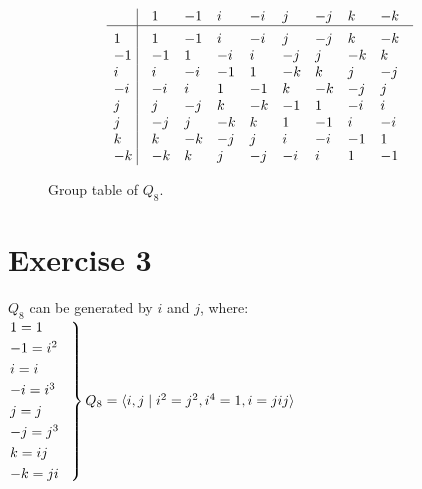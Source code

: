 \documentclass{article}
\begin{document}
    \begin{figure}[H]
        \centering

        \[\vbox{\tabskip0.5em\offinterlineskip
        \halign{\strut$#$\hfil\ \tabskip1em\vrule&&$#$\hfil\cr
        ~   & 1 & -1 & i & -i & j & -j & k & -k \cr
        \noalign{\hrule}\vrule height 12pt width 0pt
        1 & 1 & -1 & i & -i & j & -j & k & -k \cr
        -1 & -1 & 1 & -i & i & -j & j & -k & k \cr
        i & i & -i & -1 & 1 & -k & k & j & -j \cr
        -i & -i & i & 1 & -1 & k & -k & -j & j \cr
        j & j & -j & k & -k & -1 & 1 & -i & i \cr
        j & -j & j & -k & k & 1 & -1 & i & -i \cr
        k & k & -k & -j & j & i & -i & -1 & 1 \cr
        -k & -k & k & j & -j & -i & i & 1 & -1 \cr
        }}\]

        \caption{\label{fig:figure1} Group table of $Q_8$.}
    \end{figure}


    \section*{Exercise 3}
    $Q_8$ can be generated by $i$ and $j$, where: \\
    $\begin{rcases}
    1 = 1 \hspace{2em} \\
    -1 = i^2 \\
    i = i \\
    -i = i^3 \\
    j = j \\
    -j = j^3 \\
    k = ij \\
    -k = ji \\
    \end{rcases} Q_8 = \langle i, j
    \mid i^2 = j^2, i^4 = 1, i = jij \rangle$ \\
\end{document}
